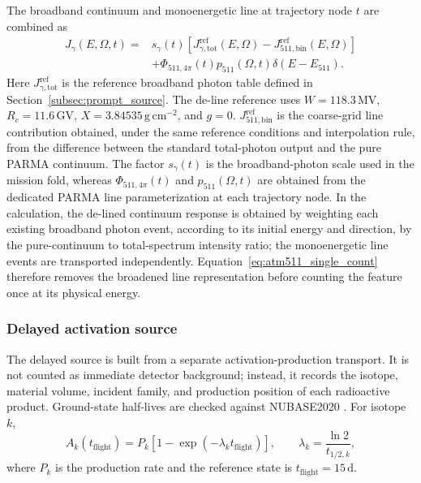 \documentclass[11pt]{article}
\begin{document}
The broadband continuum and monoenergetic line at trajectory node $t$ are
combined as
\begin{equation}
  \begin{aligned}
  J_\gamma(E,\Omega,t)={}&s_\gamma(t)
  \left[J_{\gamma,\mathrm{tot}}^{\mathrm{ref}}(E,\Omega)
  -J_{511,\mathrm{bin}}^{\mathrm{ref}}(E,\Omega)\right] \\
  &+\Phi_{511,4\pi}(t)
   p_{511}(\Omega,t)\delta(E-E_{511}).
  \end{aligned}
  \label{eq:atm511_single_count}
\end{equation}
Here $J_{\gamma,\mathrm{tot}}^{\mathrm{ref}}$ is the reference broadband photon
table defined in Section~\ref{subsec:prompt_source}. The de-line reference uses
$W=118.3\,\mathrm{MV}$, $R_c=11.6\,\mathrm{GV}$,
$X=3.84535\,\mathrm{g\,cm^{-2}}$, and $g=0$.
$J_{511,\mathrm{bin}}^{\mathrm{ref}}$ is the coarse-grid line contribution
obtained, under the same reference conditions and interpolation rule, from the
difference between the standard total-photon output and the pure PARMA
continuum. The factor $s_\gamma(t)$ is the broadband-photon scale used in the
mission fold, whereas $\Phi_{511,4\pi}(t)$ and $p_{511}(\Omega,t)$ are obtained
from the dedicated PARMA line parameterization at each trajectory node. In the
calculation, the de-lined continuum response is obtained by weighting each
existing broadband photon event, according to its initial energy and direction,
by the pure-continuum to total-spectrum intensity ratio; the monoenergetic line
events are transported independently. Equation~\eqref{eq:atm511_single_count}
therefore removes the broadened line representation before counting the feature
once at its physical energy.

\subsubsection{Delayed activation source}
\label{subsec:delayed_source}

The delayed source is built from a separate activation-production transport. It
is not counted as immediate detector background; instead, it records the isotope,
material volume, incident family, and production position of each radioactive
product. Ground-state half-lives are checked against NUBASE2020
\cite{Kondev2021NUBASE}. For isotope $k$,
\begin{equation}
  A_k(t_{\mathrm{flight}})=P_k\left[1-\exp(-\lambda_k t_{\mathrm{flight}})\right],
  \qquad \lambda_k=\frac{\ln2}{t_{1/2,k}},
\end{equation}
where $P_k$ is the production rate and the reference state is
$t_{\mathrm{flight}}=15\,\mathrm{d}$.
\end{document}
